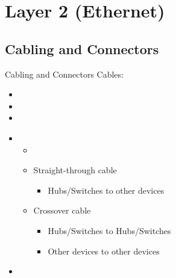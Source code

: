 \section[ethr]{Layer 2 (Ethernet)}

\subsection{Cabling and Connectors}
\begin{frame}{Cabling and Connectors}
	Cables:\pause
	\begin{itemize}[<+->]
		\item {}
		\item {}
		\item {}
	\end{itemize}
	\pause
	\begin{itemize}[<+->]
		\item {}
		\begin{itemize}
			\item {}
			\item Straight-through cable
			\begin{itemize}
				\item Hubs/Switches to other devices
			\end{itemize}
			\item Crossover cable
			\begin{itemize}
				\item Hubs/Switches to Hubs/Switches
				\item Other devices to other devices
			\end{itemize}
		\end{itemize}
		\item {}
	\end{itemize}
\end{frame}

